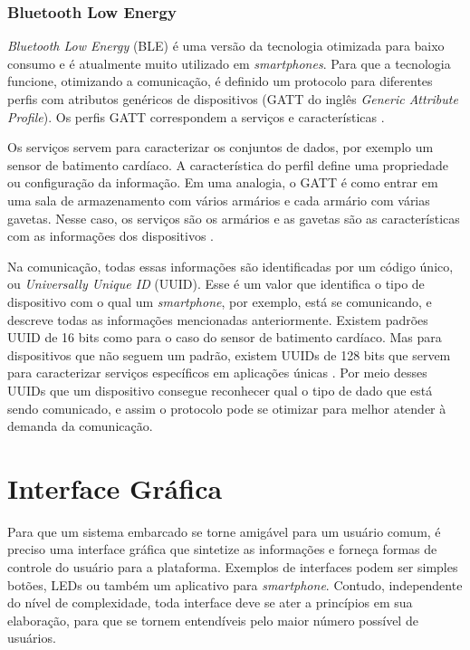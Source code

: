 \subsubsection{Bluetooth Low Energy}

\textit{Bluetooth Low Energy} (BLE) é uma versão da tecnologia otimizada para baixo consumo e é atualmente muito utilizado em \textit{smartphones}. Para que a tecnologia funcione, otimizando a comunicação, é definido um protocolo para diferentes perfis com atributos genéricos de dispositivos (GATT do inglês \textit{Generic Attribute Profile}). Os perfis GATT correspondem a serviços e características \cite{man:btlecore52}.

Os serviços servem para caracterizar os conjuntos de dados, por exemplo um sensor de batimento cardíaco. A característica do perfil define uma propriedade ou configuração da informação. Em uma analogia, o GATT é como entrar em uma sala de armazenamento com vários armários e cada armário com várias gavetas. Nesse caso, os serviços são os armários e as gavetas são as características com as informações dos dispositivos \cite{site:devzonebtle}.

Na comunicação, todas essas informações são identificadas por um código único, ou \textit{Universally Unique ID} (UUID). Esse é um valor que identifica o tipo de dispositivo com o qual um \textit{smartphone}, por exemplo, está se comunicando, e descreve todas as informações mencionadas anteriormente. Existem padrões UUID de 16 bits como para o caso do sensor de batimento cardíaco. Mas para dispositivos que não seguem um padrão, existem UUIDs de 128 bits que servem para caracterizar serviços específicos em aplicações únicas \cite{site:devzonebtle}. Por meio desses UUIDs que um dispositivo consegue reconhecer qual o tipo de dado que está sendo comunicado, e assim o protocolo pode se otimizar para melhor atender à demanda da comunicação.

\section{Interface Gráfica}
Para que um sistema embarcado se torne amigável para um usuário comum, é preciso uma interface gráfica que sintetize as informações e forneça formas de controle do usuário para a plataforma. Exemplos de interfaces podem ser simples botões, LEDs ou também um aplicativo para \textit{smartphone}. Contudo, independente do nível de complexidade, toda interface deve se ater a princípios em sua elaboração, para que se tornem entendíveis pelo maior número possível de usuários.

